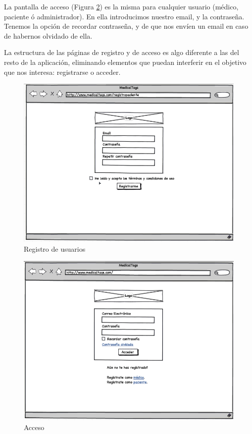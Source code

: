 			La pantalla de acceso (Figura \ref{fig:iu_acceso}) es la misma para cualquier usuario (médico, paciente ó administrador). En ella introducimos nuestro email, y la contraseña. Tenemos la opción de recordar contraseña, y de que nos envíen un email en caso de habernos olvidado de ella.
			
			La estructura de las páginas de registro y de acceso es algo diferente a las del resto de la aplicación, eliminando elementos que puedan interferir en el objetivo que nos interesa: registrarse o acceder.
					
			\begin{figure}[H]
			  \centering
			    \includegraphics[width=12cm]{img/png/interfaz/2_3_Registro.png}
			  \caption{Registro de usuarios}
			  \label{fig:iu_registro}
			\end{figure}
			
			\begin{figure}[H]
			  \centering
			    \includegraphics[width=12cm]{img/png/interfaz/5_Acceso.png}
			  \caption{Acceso}
			  \label{fig:iu_acceso}
			\end{figure}
			
